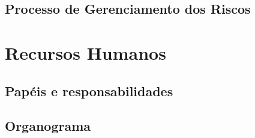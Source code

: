 \subsection{Processo de Gerenciamento dos Riscos}


\section{Recursos Humanos}
\subsection{Papéis e responsabilidades}

\subsection{Organograma}    

    
    

